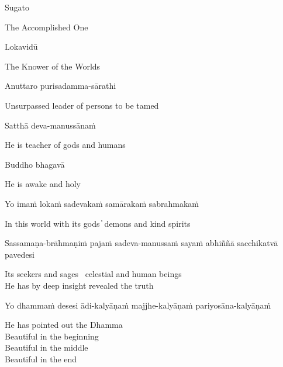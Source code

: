 Sugato

\begin{cprenglish}
  The Accomplished One
\end{cprenglish}

Lokavidū

\begin{cprenglish}
  The Knower of the Worlds
\end{cprenglish}

Anuttaro purisadamma-sārathi

\begin{cprenglish}
  Unsurpassed leader of persons to be tamed
\end{cprenglish}

Satthā deva-manussānaṁ

\begin{cprenglish}
  He is teacher of gods and humans
\end{cprenglish}

Buddho bhagavā

\begin{cprenglish}
  He is awake and holy
\end{cprenglish}

Yo imaṁ lokaṁ sadevakaṁ samārakaṁ sabrahmakaṁ

\begin{cprenglish}
  In this world with its gods ̓ demons and kind spirits
\end{cprenglish}

Sassamaṇa-brāhmaṇiṁ pajaṁ sadeva-manussaṁ sayaṁ abhiññā sacchikatvā pavedesi

\begin{cprenglish}
  Its seekers and sages \breathmark\ celestial and human beings\\
  He has by deep insight revealed the truth
\end{cprenglish}

Yo dhammaṁ desesi ādi-kalyāṇaṁ majjhe-kalyāṇaṁ pariyosāna-kalyāṇaṁ

\begin{cprenglish}
  He has pointed out the Dhamma\\
  Beautiful in the beginning\\
  Beautiful in the middle\\
  Beautiful in the end\\
\end{cprenglish}

